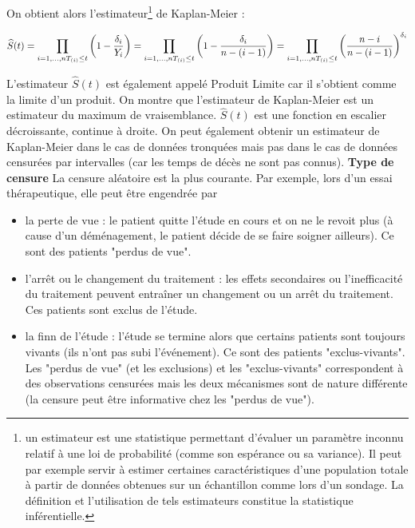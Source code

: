 On obtient alors l'estimateur\footnote{un estimateur est une statistique permettant d'évaluer un paramètre inconnu relatif à une loi de probabilité (comme son espérance ou sa variance). Il peut par exemple servir à estimer certaines caractéristiques d'une population totale à partir de données obtenues sur un échantillon comme lors d'un sondage. La définition et l'utilisation de tels estimateurs constitue la statistique inférentielle.} de Kaplan-Meier :


$$\widehat{S}(t) = \prod_{i = 1,\dots,n\\T_{(i)}\leq t} \left( 1 - \frac{\delta_{i}}{Y_{i}} \right) = \prod_{i = 1,\dots,n\\T_{(i)}\leq t} \left( 1 - \frac{\delta_{i}}{n-(i-1)} \right) = \prod_{i = 1,\dots,n\\T_{(i)}\leq t} \left( \frac{n-i}{n-(i-1)} \right)^{\delta_{i}}$$

L'estimateur $\widehat{S}(t)$ est également appelé Produit Limite car il s'obtient comme la limite d'un produit. On montre que l'estimateur de Kaplan-Meier est un estimateur du maximum de vraisemblance. $\widehat{S}(t)$ est une fonction en escalier décroissante, continue à droite. On peut également obtenir un estimateur de Kaplan-Meier dans le cas de données tronquées mais pas dans le cas de données censurées par intervalles (car les temps de décès ne sont pas connus).\newline
\textbf{Type de censure}
La censure aléatoire est la plus courante. Par exemple, lors d'un essai thérapeutique, elle peut être engendrée par
\begin{itemize}
\item la perte de vue : le patient quitte l'étude en cours et on ne le revoit plus (à cause d'un déménagement, le patient décide de se faire soigner ailleurs). Ce sont des patients "perdus de vue".
\item l'arrêt ou le changement du traitement : les effets secondaires ou l'inefficacité du traitement peuvent entraîner un changement ou un arrêt du traitement. Ces patients sont exclus de l'étude.
\item la finn de l'étude : l'étude se termine alors que certains patients sont toujours vivants (ils n'ont pas subi l'événement). Ce sont des patients "exclus-vivants". Les "perdus de vue" (et les exclusions) et les "exclus-vivants" correspondent à des observations censurées mais les deux mécanismes sont de nature différente (la censure peut être informative chez les "perdus de vue").
\end{itemize}
